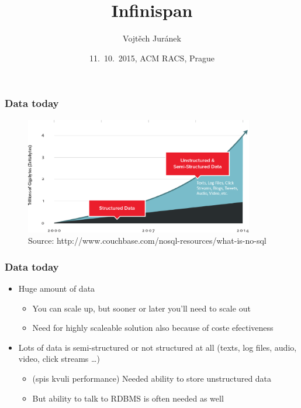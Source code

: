 \documentclass[10pt,utf8]{beamer}
\title{Infinispan}
\author{Vojtěch Juránek}
\institute[Red Hat]{JBoss - a division by Red Hat}
\date{11.~10.~2015, ACM RACS, Prague}
\begin{document}


\begin{frame}
 \titlepage
\end{frame}

\begin{frame}
	\frametitle{Data today}
	\begin{figure}
		\centering
		\includegraphics[width=10cm]{./img/why-nosql-2.eps}
		\caption{\tiny{Source: http://www.couchbase.com/nosql-resources/what-is-no-sql}}
	\end{figure}
\end{frame}

\begin{frame}
	\frametitle{Data today}
	\begin{itemize}
		\item Huge amount of data
		\begin{itemize}
			\item You can scale up, but sooner or later you'll need to scale out
			\item Need for highly scaleable solution also because of coste efectiveness
		\end{itemize}
		\item Lots of data is semi-structured or not structured at all (texts, log files, audio, video, click streams \dots)
		\begin{itemize}
			\item (spis kvuli performance) Needed ability to store unstructured data
			\item But ability  to talk to RDBMS is often needed as well
		\end{itemize}
	\end{itemize}
\end{frame}
\end{document}
